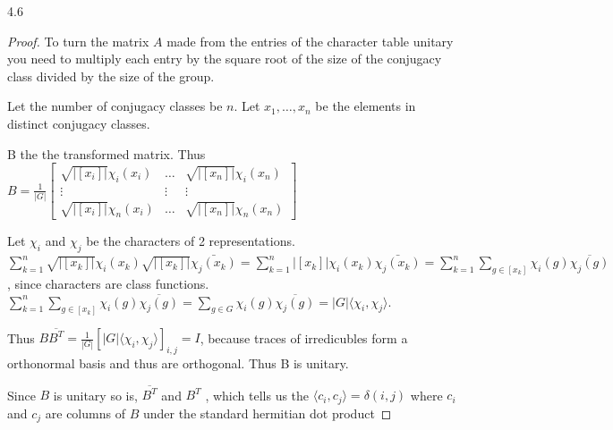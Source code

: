 \documentclass{article}
\newcommand{\angles}[1]{\langle #1 \rangle}
\begin{document}
\bigskip

\begin{PROB}{4.6}\label{Problem 4.6.}
    
\end{PROB}
\begin{proof}
    To turn the matrix $A$ made from the entries of the character table unitary you need to multiply each entry by the square root of the size of the conjugacy class divided by the size of the group. 
    
    Let the number of conjugacy classes be $n$. Let $x_1, \dots, x_n$ be the elements in distinct conjugacy classes. 
    
    B the the transformed matrix. Thus $B = \frac{1}{|G|}\begin{bmatrix}
        \sqrt{|[x_i]|} \chi_i(x_i) & \dots & \sqrt{|[x_n]|} \chi_i(x_n) \\ 
        \vdots & \vdots & \vdots \\
        \sqrt{|[x_i]|} \chi_n(x_i) & \dots & \sqrt{|[x_n]|} \chi_n(x_n)
    \end{bmatrix}$
    
    Let $\chi_i$ and $\chi_j$ be the characters of 2 representations. $\sum_{k = 1}^{n}\sqrt{|[x_k]|} \chi_i(x_k) \sqrt{|[x_k]|} \bar{\chi_j(x_k)}  = \sum_{k = 1}^{n} |[x_k]| \chi_i(x_k) \bar{\chi_j(x_k)} = \sum_{k = 1}^{n} \sum_{g \in [x_k]} \chi_i(g) \overline{\chi_j(g)}$, since characters are class functions. $\sum_{k = 1}^{n} \sum_{g \in [x_k]} \chi_i(g) \overline{\chi_j(g)} = \sum_{g \in G} \chi_i(g) \overline{\chi_j(g)} = |G| \angles{\chi_i, \chi_j}$.
    
    Thus $B \overline{B^T} = \frac{1}{|G|}[|G|\angles{\chi_i, \chi_j}]_{i,j} = I$, because traces of irredicubles form a orthonormal basis and thus are orthogonal. Thus B is unitary.  


    Since $B$ is unitary so is, $\overline{B^T}$ and $B^T$ , which tells us the $\angles{c_i, c_j} = \delta(i, j)$ where $c_i$ and $c_j$ are columns of $B$ under the standard hermitian dot product    
\end{proof}
\end{document}
